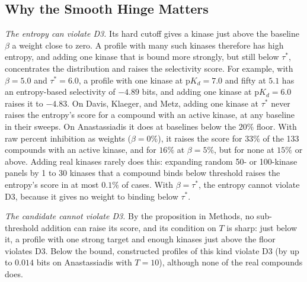 \subsection{Why the Smooth Hinge Matters}
\label{sec:hinge}

\textit{The entropy can violate D3.} Its hard cutoff gives a kinase just above
the baseline $\beta$ a weight close to zero. A profile with many such
kinases therefore has high entropy, and adding one kinase that is bound more
strongly, but still below $\tau^*$, concentrates the distribution and raises the
selectivity score. For example, with $\beta = 5.0$ and $\tau^* = 6.0$, a profile
with one kinase at $\mathrm{p}K_d = 7.0$ and fifty at $5.1$ has an
entropy-based selectivity of $-4.89$ bits, and adding one kinase at
$\mathrm{p}K_d = 6.0$ raises it to $-4.83$.
On Davis, Klaeger, and Metz, adding one kinase at $\tau^*$ never raises the
entropy's score for a compound with an active kinase, at any baseline in their
sweeps. On Anastassiadis it does at baselines below the $20\%$ floor. With raw
percent inhibition as weights ($\beta = 0\%$), it raises the score for $33\%$ of
the 133 compounds with an active kinase, and for $16\%$ at $\beta = 5\%$, but
for none at $15\%$ or above. Adding real kinases rarely does this: expanding
random 50- or 100-kinase panels by 1 to 30 kinases that a compound binds below
threshold raises the entropy's score in at most $0.1\%$ of cases. With
$\beta = \tau^*$, the entropy cannot violate D3, because it gives no weight to
binding below $\tau^*$.

\textit{The candidate cannot violate D3.} By the proposition in Methods, no
sub-threshold addition can raise its score, and its condition on $T$ is sharp:
just below it, a profile with one strong target and enough kinases just above
the floor violates D3. Below the bound, constructed profiles of this kind
violate D3 (by up to $0.014$ bits on Anastassiadis with $T = 10$), although none
of the real compounds does.
